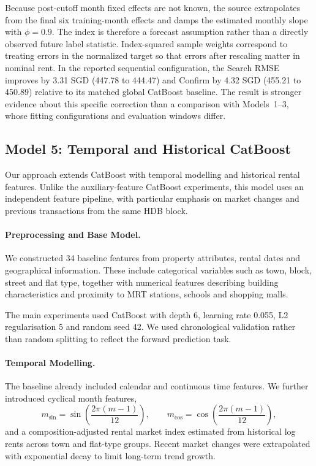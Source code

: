 \documentclass[10pt,a4paper]{article}
\begin{document}
Because post-cutoff month fixed effects are not known, the source extrapolates from the final six training-month effects and damps the estimated monthly slope with $\phi=0.9$. The index is therefore a forecast assumption rather than a directly observed future label statistic. Index-squared sample weights correspond to treating errors in the normalized target so that errors after rescaling matter in nominal rent. In the reported sequential configuration, the Search RMSE improves by 3.31 SGD (447.78 to 444.47) and Confirm by 4.32 SGD (455.21 to 450.89) relative to its matched global CatBoost baseline. The result is stronger evidence about this specific correction than a comparison with Models~1--3, whose fitting configurations and evaluation windows differ.

\subsection{Model 5: Temporal and Historical CatBoost}

Our approach extends CatBoost with temporal modelling and historical rental features. Unlike the auxiliary-feature CatBoost experiments, this model uses an independent feature pipeline, with particular emphasis on market changes and previous transactions from the same HDB block.

\paragraph{Preprocessing and Base Model.}
We constructed 34 baseline features from property attributes, rental dates and geographical information. These include categorical variables such as town, block, street and flat type, together with numerical features describing building characteristics and proximity to MRT stations, schools and shopping malls.

The main experiments used CatBoost with depth 6, learning rate 0.055, L2 regularisation 5 and random seed 42. We used chronological validation rather than random splitting to reflect the forward prediction task.

\paragraph{Temporal Modelling.}
The baseline already included calendar and continuous time features. We further introduced cyclical month features,
\[
m_{\sin}=\sin\left(\frac{2\pi(m-1)}{12}\right),
\qquad
m_{\cos}=\cos\left(\frac{2\pi(m-1)}{12}\right),
\]
and a composition-adjusted rental market index estimated from historical log rents across town and flat-type groups. Recent market changes were extrapolated with exponential decay to limit long-term trend growth.
\end{document}
